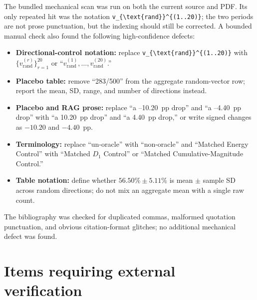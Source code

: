 \documentclass[11pt]{article}
\begin{document}
The bundled mechanical scan was run on both the current source and PDF.  Its only repeated hit was the notation \verb|v_{\text{rand}}^{(1..20)}|; the two periods are not prose punctuation, but the indexing should still be corrected.  A bounded manual check also found the following high-confidence defects:

\begin{itemize}
    \item \textbf{Directional-control notation:} replace \verb|v_{\text{rand}}^{(1..20)}| with $\{v_{\mathrm{rand}}^{(r)}\}_{r=1}^{20}$ or ``$v_{\mathrm{rand}}^{(1)},\ldots,v_{\mathrm{rand}}^{(20)}$.''
    \item \textbf{Placebo table:} remove ``283/500'' from the aggregate random-vector row; report the mean, SD, range, and number of directions instead.
    \item \textbf{Placebo and RAG prose:} replace ``a --10.20~pp drop'' and ``a --4.40~pp drop'' with ``a 10.20~pp drop'' and ``a 4.40~pp drop,'' or write signed changes as $-10.20$ and $-4.40$~pp.
    \item \textbf{Terminology:} replace ``un-oracle'' with ``non-oracle'' and ``Matched Energy Control'' with ``Matched $D_1$ Control'' or ``Matched Cumulative-Magnitude Control.''
    \item \textbf{Table notation:} define whether $56.50\%\pm5.11\%$ is mean $\pm$ sample SD across random directions; do not mix an aggregate mean with a single raw count.
\end{itemize}

The bibliography was checked for duplicated commas, malformed quotation punctuation, and obvious citation-format glitches; no additional mechanical defect was found.

\section*{Items requiring external verification}
\end{document}
